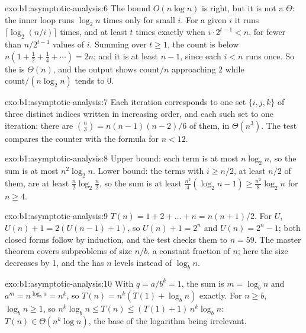 \begin{solution}{exo:b1:asymptotic-analysis:6}
The bound $O(n \log n)$ is right, but it is not a $\Theta$: the inner loop runs $\log_2 n$ times only for small $i$. For a
given $i$ it runs $\lceil \log_2 (n/i) \rceil$ times, and at least $t$ times exactly when $i \cdot 2^{t - 1} < n$, for
fewer than $n/2^{t - 1}$ values of $i$. Summing over $t \geq 1$, the count is below $n(1 + \frac12 + \frac14 + \cdots) =
2n$; and it is at least $n - 1$, since each $i < n$ runs once. So the  is $\Theta(n)$, and the output shows
$\text{count}/n$ approaching 2 while $\text{count}/(n \log_2 n)$ tends to 0.
\end{solution}

\begin{solution}{exo:b1:asymptotic-analysis:7}
Each iteration corresponds to one set $\{i, j, k\}$ of three distinct indices written in increasing order, and each such
set to one iteration: there are $\binom{n}{3} = n(n - 1)(n - 2)/6$ of them, in $\Theta(n^3)$. The test compares the
counter with the formula for $n < 12$.
\end{solution}

\begin{solution}{exo:b1:asymptotic-analysis:8}
Upper bound: each term is at most $n \log_2 n$, so the sum is at most $n^2 \log_2 n$. Lower bound: the terms with $i
\geq n/2$, at least $n/2$ of them, are at least $\frac n2 \log_2 \frac n2$, so the sum is at least $\frac{n^2}{4}(\log_2 n
- 1) \geq \frac{n^2}{8} \log_2 n$ for $n \geq 4$.
\end{solution}

\begin{solution}{exo:b1:asymptotic-analysis:9}
$T(n) = 1 + 2 + \dots + n = n(n + 1)/2$. For $U$, $U(n) + 1 = 2(U(n - 1) + 1)$, so $U(n) + 1 = 2^n$ and $U(n) = 2^n -
1$; both closed forms follow by induction, and the test checks them to $n = 59$. The master theorem covers subproblems
of size $n/b$, a constant fraction of $n$; here the size decreases by 1, and the  has $n$ levels instead of
$\log_b n$.
\end{solution}

\begin{solution}{exo:b1:asymptotic-analysis:10}
With $q = a/b^k = 1$, the sum is $m = \log_b n$ and $a^m = n^{\log_b a} = n^k$, so $T(n) = n^k (T(1) + \log_b n)$ exactly.
For $n \geq b$, $\log_b n \geq 1$, so $n^k \log_b n \leq T(n) \leq (T(1) + 1)\, n^k \log_b n$: $T(n) \in \Theta(n^k \log
n)$, the base of the logarithm being irrelevant.
\end{solution}

